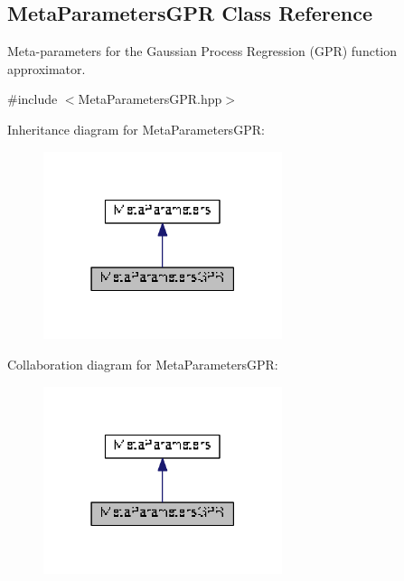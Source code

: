\hypertarget{classDmpBbo_1_1MetaParametersGPR}{\subsection{Meta\+Parameters\+G\+P\+R Class Reference}
\label{classDmpBbo_1_1MetaParametersGPR}
}


Meta-\/parameters for the Gaussian Process Regression (G\+P\+R) function approximator.  




{\ttfamily \#include $<$Meta\+Parameters\+G\+P\+R.\+hpp$>$}



Inheritance diagram for Meta\+Parameters\+G\+P\+R\+:
\nopagebreak
\begin{figure}[H]
\begin{center}
\leavevmode
\includegraphics[width=198pt]{classDmpBbo_1_1MetaParametersGPR__inherit__graph}
\end{center}
\end{figure}


Collaboration diagram for Meta\+Parameters\+G\+P\+R\+:
\nopagebreak
\begin{figure}[H]
\begin{center}
\leavevmode
\includegraphics[width=198pt]{classDmpBbo_1_1MetaParametersGPR__coll__graph}
\end{center}
\end{figure}
